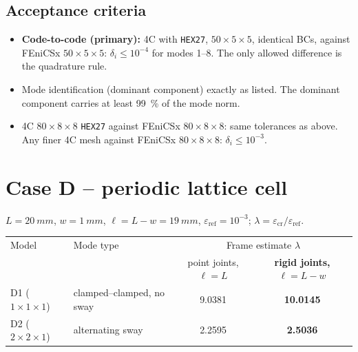 \documentclass[11pt,a4paper]{report}
\newcommand{\refval}[1]{\textbf{#1}}
\begin{document}
\subsection*{Acceptance criteria}
\begin{itemize}
\item \textbf{Code-to-code (primary):} 4C with \texttt{HEX27},
  $50\times5\times5$, identical BCs, against FEniCSx $50\times5\times5$:
  $\delta_i\le10^{-4}$ for modes 1--8. The only allowed difference is the
  quadrature rule.
\item Mode identification (dominant component) exactly as listed. The
  dominant component carries at least \SI{99}{\percent} of the mode norm.
\item 4C $80\times8\times8$ \texttt{HEX27} against FEniCSx $80\times8\times8$: same tolerances as above. Any finer 4C mesh against FEniCSx $80\times8\times8$: $\delta_i\le10^{-3}$.
\end{itemize}

\section{Case D -- periodic lattice cell}
$L=\SI{20}{mm}$, $w=\SI{1}{mm}$, $\ell=L-w=\SI{19}{mm}$, $\varepsilon_\text{ref}=10^{-3}$; $\lambda=\varepsilon_\text{cr}/\varepsilon_\text{ref}$.
\begin{center}
\begin{tabular}{@{}llcc@{}}
\toprule
Model & Mode type & \multicolumn{2}{c}{Frame estimate $\lambda$} \\
 & & point joints, $\ell=L$ & \refval{rigid joints, $\ell=L-w$} \\
\midrule
D1 ($1\times1\times1$) & clamped--clamped, no sway & 9.0381 & \refval{10.0145} \\
D2 ($2\times2\times1$) & alternating sway & 2.2595 & \refval{2.5036} \\
\bottomrule
\end{tabular}
\end{center}
\end{document}
